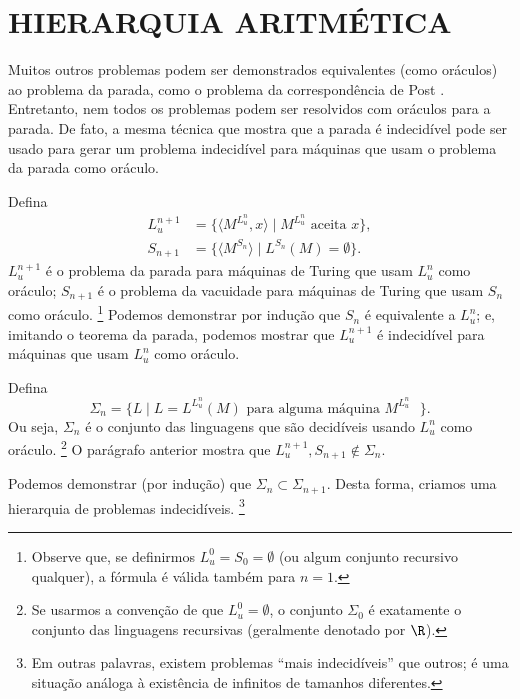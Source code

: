 \section{HIERARQUIA ARITMÉTICA}
\label{sec:arithmetical_hierarchy}

Muitos outros problemas podem ser demonstrados equivalentes
(como oráculos)
ao problema da parada,
como o problema da correspondência de Post \cite[p.~214]{HopcroftUllman1979}.
Entretanto,
nem todos os problemas podem ser resolvidos com oráculos para a parada.
De fato, a mesma técnica que mostra que a parada é indecidível
pode ser usado para gerar um problema indecidível
para máquinas que usam o problema da parada como oráculo.

Defina
\begin{align*}
    L_u^{n+1} &= \{ \langle M^{L_u^n}, x \rangle \mid M^{L_u^n} \text{ aceita } x \}, \\
    S_{n+1} &= \{ \langle M^{S_n} \rangle \mid L^{S_n}(M) = \emptyset \}.
\end{align*}
$L_u^{n+1}$ é o problema da parada
para máquinas de Turing que usam $L_u^n$ como oráculo;
$S_{n+1}$ é o problema da vacuidade
para máquinas de Turing que usam $S_n$ como oráculo.%
\footnote{
    Observe que,
    se definirmos $L_u^0 = S_0 = \emptyset$
    (ou algum conjunto recursivo qualquer),
    a fórmula é válida também para $n = 1$.
}
Podemos demonstrar por indução que $S_n$ é equivalente a $L_u^n$;
e, imitando o teorema da parada,
podemos mostrar que $L_u^{n+1}$ é indecidível para máquinas que usam $L_u^n$ como oráculo.

Defina
\begin{equation*}
    \Sigma_n = \{ L \mid L = L^{L_u^n}(M) \text{ para alguma máquina $M^{L_u^n}$ } \}.
\end{equation*}
Ou seja, $\Sigma_n$ é o conjunto das linguagens
que são decidíveis usando $L_u^n$ como oráculo.%
\footnote{
    Se usarmos a convenção de que $L_u^0 = \emptyset$,
    o conjunto $\Sigma_0$ é exatamente o conjunto das linguagens recursivas
    (geralmente denotado por $\R$).
}
O parágrafo anterior mostra que $L_u^{n+1}, S_{n+1} \notin \Sigma_n$.

Podemos demonstrar (por indução) que $\Sigma_n \subset \Sigma_{n+1}$.
Desta forma,
criamos uma hierarquia de problemas indecidíveis.%
\footnote{
    Em outras palavras,
    existem problemas ``mais indecidíveis'' que outros;
    é uma situação análoga à existência de infinitos de tamanhos diferentes.
}


